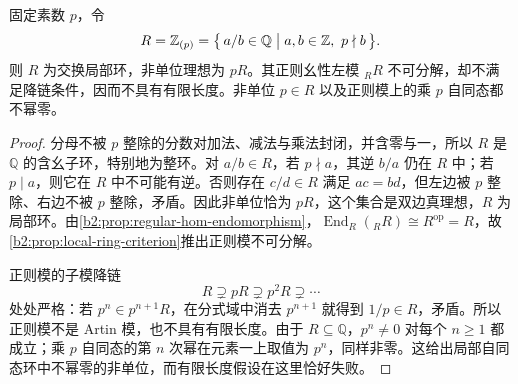 \begin{proposition}\label{b2:prop:local-ring-nonnilpotent}
	固定素数 \(p\)，令
	\[
		R=\mathbb Z_{(p)} =\bigl\{\,a/b\in\mathbb Q\bigm|a,b\in\mathbb Z,\ p\nmid b\,\bigr\}.
	\]
	则 \(R\) 为交换局部环，非单位理想为 \(pR\)。其正则幺性左模 \({}_RR\) 不可分解，却不满足降链条件，因而不具有有限长度。非单位 \(p\in R\) 以及正则模上的乘 \(p\) 自同态都不幂零。
\end{proposition}
\begin{proof}
	分母不被 \(p\) 整除的分数对加法、减法与乘法封闭，并含零与一，所以 \(R\) 是 \(\mathbb Q\) 的含幺子环，特别地为整环。对 \(a/b\in R\)，若 \(p\nmid a\)，其逆 \(b/a\) 仍在 \(R\) 中；若 \(p\mid a\)，则它在 \(R\) 中不可能有逆。否则存在 \(c/d\in R\) 满足 \(ac=bd\)，但左边被 \(p\) 整除、右边不被 \(p\) 整除，矛盾。因此非单位恰为 \(pR\)，这个集合是双边真理想，\(R\) 为局部环。由\cref{b2:prop:regular-hom-endomorphism}，\(\operatorname{End}_R({}_RR)\cong R^{\mathrm{op}}=R\)，故\cref{b2:prop:local-ring-criterion}推出正则模不可分解。

	正则模的子模降链
	\[
		R\supsetneq pR\supsetneq p^2R\supsetneq\cdots
	\]
	处处严格：若 \(p^n\in p^{n+1}R\)，在分式域中消去 \(p^{n+1}\) 就得到 \(1/p\in R\)，矛盾。所以正则模不是 Artin 模，也不具有有限长度。由于 \(R\subseteq\mathbb Q\)，\(p^n\ne0\) 对每个 \(n\ge1\) 都成立；乘 \(p\) 自同态的第 \(n\) 次幂在元素一上取值为 \(p^n\)，同样非零。这给出局部自同态环中不幂零的非单位，而有限长度假设在这里恰好失败。
\end{proof}
